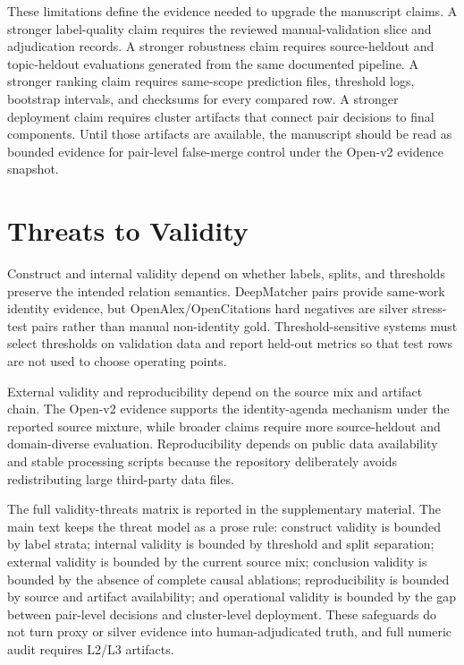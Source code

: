 \documentclass[preprint,12pt]{elsarticle}
\begin{document}
These limitations define the evidence needed to upgrade the manuscript claims. A stronger label-quality claim requires the reviewed manual-validation slice and adjudication records. A stronger robustness claim requires source-heldout and topic-heldout evaluations generated from the same documented pipeline. A stronger ranking claim requires same-scope prediction files, threshold logs, bootstrap intervals, and checksums for every compared row. A stronger deployment claim requires cluster artifacts that connect pair decisions to final components. Until those artifacts are available, the manuscript should be read as bounded evidence for pair-level false-merge control under the Open-v2 evidence snapshot.

\section{Threats to Validity}

Construct and internal validity depend on whether labels, splits, and thresholds preserve the intended relation semantics. DeepMatcher pairs provide same-work identity evidence, but OpenAlex/OpenCitations hard negatives are silver stress-test pairs rather than manual non-identity gold. Threshold-sensitive systems must select thresholds on validation data and report held-out metrics so that test rows are not used to choose operating points.

External validity and reproducibility depend on the source mix and artifact chain. The Open-v2 evidence supports the identity-agenda mechanism under the reported source mixture, while broader claims require more source-heldout and domain-diverse evaluation. Reproducibility depends on public data availability and stable processing scripts because the repository deliberately avoids redistributing large third-party data files.

The full validity-threats matrix is reported in the supplementary material. The main text keeps the threat model as a prose rule: construct validity is bounded by label strata; internal validity is bounded by threshold and split separation; external validity is bounded by the current source mix; conclusion validity is bounded by the absence of complete causal ablations; reproducibility is bounded by source and artifact availability; and operational validity is bounded by the gap between pair-level decisions and cluster-level deployment. These safeguards do not turn proxy or silver evidence into human-adjudicated truth, and full numeric audit requires L2/L3 artifacts.
\end{document}
